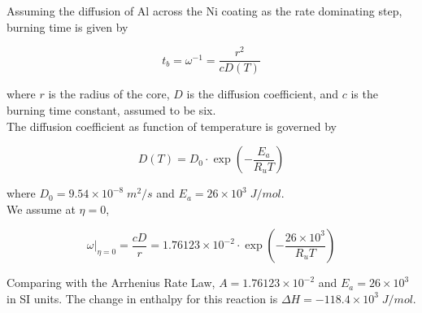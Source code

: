 \documentclass[../main.tex]{subfiles}
\begin{document}
Assuming the diffusion of Al across the Ni coating as the rate dominating step, burning time is given by

\begin{equation}
    t_b = \omega ^{-1} = \frac{r^2}{cD(T)}
\end{equation}

where $r$ is the radius of the core, $D$ is the diffusion coefficient, and $c$ is the burning time constant, assumed to be six. \\

\noindent
The diffusion coefficient as function of temperature is governed by

\begin{equation}
    D(T) = D_0 \cdot \exp{\left( - \frac{E_a}{R_u T} \right)}
\end{equation}

where $D_0 = 9.54 \times 10^{-8}\;m^2/s$ and $E_a = 26\times  10^3\;J/mol$. \\

\noindent
We assume at $\eta=0$,

\begin{equation}
    \omega \vert_{\eta=0} = \frac{cD}{r} = 1.76123 \times 10^{-2} \cdot \exp{\left(-\frac{26\times10^3}{R_u T}\right)}
\end{equation}

\noindent
Comparing with the Arrhenius Rate Law, $A = 1.76123 \times 10^{-2}$ and $E_a = 26\times  10^3$ in SI units. The change in enthalpy for this reaction is $\Delta H = - 118.4 \times 10^3 \; J/mol$.
\end{document}
